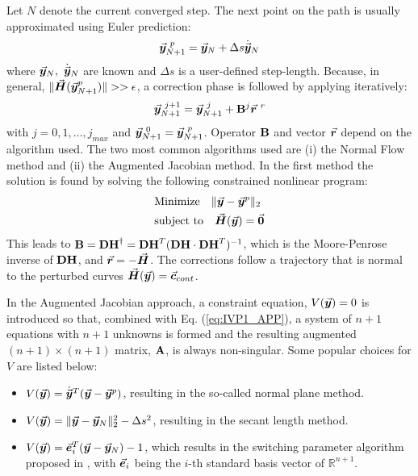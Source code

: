 \begin{appendices}
Let $N$ denote the current
converged step. The next point on the path is usually approximated using Euler
prediction:
\begin{equation}
	\vec{\bm{y}}^{\ p}_{N+1} = \vec{\bm{y}}_N+\Delta s\dot{\vec{\bm{y}}}_N
	\label{eq:Nprediction}
\end{equation}
where $\vec{\bm{y}}_N,\ \dot{\vec{\bm{y}}}_N$ are known and $\Delta s$ is a 
user-defined 
step-length. Because, in general, $\Vert 
\vec{\bm{H}}(\vec{\bm{y}}_{N+1}^p)\Vert>>\epsilon$, 
a correction phase is followed by applying iteratively:
\begin{equation}
	\bvec{y}_{N+1}^{\ j+1}=\bvec{y}_{N+1}^{\ j}+\bmat{B}^j\bvec{r}^{\ r}
	\label{eq:corrections}
\end{equation}
with $j=0,1,\dots,j_{max}$ and $\bvec{y}_{N+1}^{\ 0}=\bvec{y}^{\ p}_{N+1}$. 
Operator
$\mathbf{B}$ and vector $\vec{\bm{r}}$ 
depend on the algorithm used. The two most common algorithms used are (i) the 
Normal Flow
method\cite{Watson87,Ragon:2002,Allgower:2003} and (ii) the Augmented Jacobian
method\cite{Rheinboldt:1983B,Watson87,Keller:1978}. In the first method 
the solution is found by
solving the following constrained nonlinear program:
\begin{align*}
	&\text{Minimize}\ \ \ \Vert \vec{\bm{y}}-\vec{\bm{y}}^p\Vert_2\\
	&\text{subject to}\ \ \ \vec{\bm{H}}(\vec{\bm{y}})=\vec{\bm{0}}
	\label{eq:minimizationNF}
\end{align*}
This leads to $\mathbf{B}= \mathbf{DH}^\dagger=\mathbf{DH}^T(\mathbf{DH}\cdot
\mathbf{DH}^T)^{-1}$, which is the Moore-Penrose inverse of $\mathbf{DH}$,
and $\vec{\bm{r}}=-\vec{\bm{H}}$. 
The corrections follow a trajectory that is normal to the perturbed curves
$\vec{\bm{H}}(\vec{\bm{y}})=\vec{\bm{c}}_{cont}$. 

In the Augmented Jacobian approach, a constraint equation, $V(\vec{\bm{y}})=0$ is 
introduced so that, combined with Eq. (\ref{eq:IVP1_APP}), a system of $n+1$ 
equations with $n+1$ unknowns is formed and the resulting augmented
$(n+1)\times(n+1)$ matrix, $\mathbf{A}$, is always non-singular. Some popular
choices for $V$ are listed below:  
\begin{itemize}
	\item $V(\vec{\bm{y}}) = \dot{\vec{\bm{y}}}^T(\vec{\bm{y}}-\vec{\bm{y}}^p)$, resulting in 
	the
	so-called normal plane method.
	\item $V(\vec{\bm{y}})= \Vert \vec{\bm{y}}-\vec{\bm{y}}_N\Vert^2_2-\Delta s^2$, 
	resulting in 
	the secant length method\cite{Menzel:1985}.
	\item $V(\vec{\bm{y}}) = \vec{\bm{e}}_i^T(\vec{\bm{y}}-\vec{\bm{y}}_N)-1$, which results in 
	the switching
	parameter algorithm proposed in \cite{Rheinboldt:1980}, with $\vec{\bm{e}}_i$
	being the $i$-th standard basis vector of $\mathbb{R}^{n+1}$.
\end{itemize}


\end{appendices}
